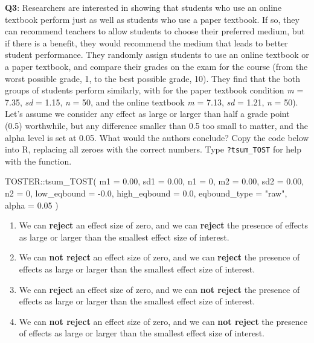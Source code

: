 \documentclass[
  oneside]{book}
\newenvironment{Shaded}{\begin{snugshade}}{\end{snugshade}}
\newcommand{\AttributeTok}[1]{\textcolor[rgb]{0.77,0.63,0.00}{#1}}
\newcommand{\DecValTok}[1]{\textcolor[rgb]{0.00,0.00,0.81}{#1}}
\newcommand{\FloatTok}[1]{\textcolor[rgb]{0.00,0.00,0.81}{#1}}
\newcommand{\FunctionTok}[1]{\textcolor[rgb]{0.00,0.00,0.00}{#1}}
\newcommand{\NormalTok}[1]{#1}
\newcommand{\SpecialCharTok}[1]{\textcolor[rgb]{0.00,0.00,0.00}{#1}}
\newcommand{\StringTok}[1]{\textcolor[rgb]{0.31,0.60,0.02}{#1}}
\providecommand{\tightlist}{%
  \setlength{\itemsep}{0pt}\setlength{\parskip}{0pt}}
\begin{document}
\textbf{Q3}: Researchers are interested in showing that students who use an online textbook perform just as well as students who use a paper textbook. If so, they can recommend teachers to allow students to choose their preferred medium, but if there is a benefit, they would recommend the medium that leads to better student performance. They randomly assign students to use an online textbook or a paper textbook, and compare their grades on the exam for the course (from the worst possible grade, 1, to the best possible grade, 10). They find that the both groups of students perform similarly, with for the paper textbook condition \emph{m} = 7.35, \emph{sd} = 1.15, \emph{n} = 50, and the online textbook \emph{m} = 7.13, \emph{sd} = 1.21, \emph{n} = 50). Let's assume we consider any effect as large or larger than
half a grade point (0.5) worthwhile, but any difference smaller than 0.5 too small to matter, and the alpha level is set at 0.05. What would the authors conclude? Copy the code below into R, replacing all zeroes with the correct numbers. Type \texttt{?tsum\_TOST} for help with the function.

\begin{Shaded}
\begin{Highlighting}[]
\NormalTok{TOSTER}\SpecialCharTok{::}\FunctionTok{tsum\_TOST}\NormalTok{(}
  \AttributeTok{m1 =} \FloatTok{0.00}\NormalTok{,}
  \AttributeTok{sd1 =} \FloatTok{0.00}\NormalTok{,}
  \AttributeTok{n1 =} \DecValTok{0}\NormalTok{,}
  \AttributeTok{m2 =} \FloatTok{0.00}\NormalTok{,}
  \AttributeTok{sd2 =} \FloatTok{0.00}\NormalTok{,}
  \AttributeTok{n2 =} \DecValTok{0}\NormalTok{,}
  \AttributeTok{low\_eqbound =} \SpecialCharTok{{-}}\FloatTok{0.0}\NormalTok{,}
  \AttributeTok{high\_eqbound =} \FloatTok{0.0}\NormalTok{,}
  \AttributeTok{eqbound\_type =} \StringTok{"raw"}\NormalTok{,}
  \AttributeTok{alpha =} \FloatTok{0.05}
\NormalTok{)}
\end{Highlighting}
\end{Shaded}

\begin{enumerate}
\def\labelenumi{\Alph{enumi})}
\tightlist
\item
  We can \textbf{reject} an effect size of zero, and we can \textbf{reject} the presence of effects as large or larger than the smallest effect size of interest.
\item
  We can \textbf{not reject} an effect size of zero, and we can \textbf{reject} the presence of effects as large or larger than the smallest effect size of interest.
\item
  We can \textbf{reject} an effect size of zero, and we can \textbf{not reject} the presence of effects as large or larger than the smallest effect size of interest.
\item
  We can \textbf{not reject} an effect size of zero, and we can \textbf{not reject} the presence of effects as large or larger than the smallest effect size of interest.
\end{enumerate}
\end{document}
